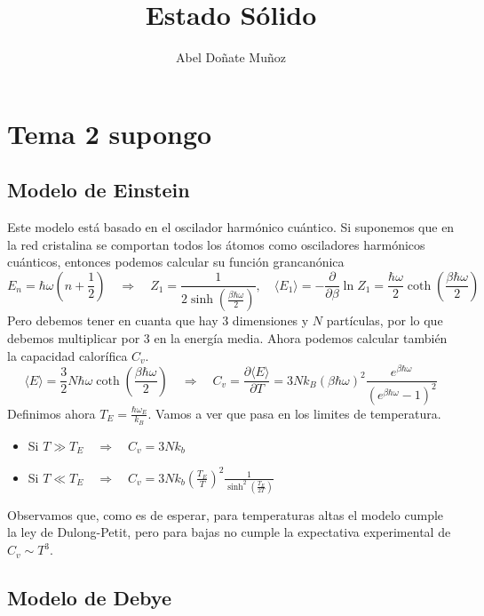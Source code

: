 \documentclass[leqno]{article}
\title{Estado Sólido}
\author{Abel Doñate Muñoz}
\date{}
\begin{document}
\maketitle
\tableofcontents
\newpage

\section{Tema 2 supongo}
\subsection{Modelo de Einstein}
Este modelo está basado en el oscilador harmónico cuántico. Si suponemos que en la red cristalina se comportan todos los átomos como osciladores harmónicos cuánticos, entonces podemos calcular su función grancanónica
\[
  E_n = \hbar \omega (n+\frac{1}{2}) \quad \Rightarrow \quad Z_1 = \frac{1}{2 \sinh(\frac{\beta \hbar \omega }{2})}, \quad \langle E_1 \rangle = - \frac{\partial }{\partial \beta } \ln Z_1 = \frac{\hbar\omega }{2} \coth \left( \frac{\beta \hbar \omega }{2} \right) 
\] 
Pero debemos tener en cuanta que hay 3 dimensiones y $N$ partículas, por lo que debemos multiplicar por 3 en la energía media. Ahora podemos calcular también la capacidad calorífica $C_v$.
 \[
\langle E\rangle = \frac{3}{2} N \hbar \omega \coth \left( \frac{\beta \hbar \omega  }{2} \right) \quad \Rightarrow \quad
C_v = \frac{\partial \langle E\rangle}{\partial T}  = 3Nk_B (\beta \hbar \omega )^2 \frac{e^{\beta \hbar \omega }}{(e^{\beta \hbar \omega }-1)^2}
\] 
Definimos ahora $T_E = \frac{\hbar \omega_E}{k_B}$. Vamos a ver que pasa en los limites de temperatura.

\begin{itemize}[topsep=-6pt, itemsep=0pt]
  \item Si  $T\gg T_E \quad \Rightarrow \quad C_v = 3Nk_b$
  \item Si  $T\ll T_E \quad \Rightarrow \quad C_v = 3Nk_b (\frac{T_E}{T})^2 \frac{1}{\sinh ^2(\frac{T_E}{2T})}$
\end{itemize}

Observamos que, como es de esperar, para temperaturas altas el modelo cumple la ley de Dulong-Petit, pero para bajas no cumple la expectativa experimental de $C_v \sim  T^3$.

\subsection{Modelo de Debye}
\end{document}
